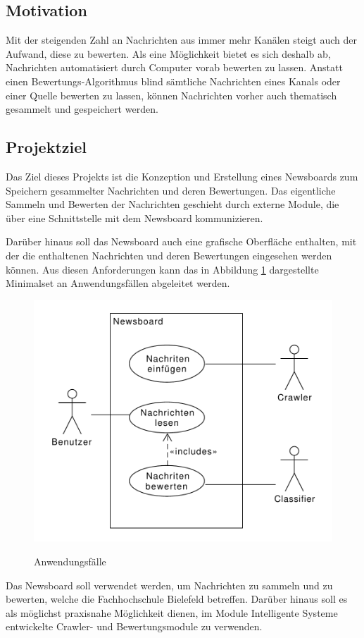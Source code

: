 \subsection{Motivation}
Mit der steigenden Zahl an Nachrichten aus immer mehr Kanälen steigt auch der Aufwand,
diese zu bewerten. Als eine Möglichkeit bietet es sich deshalb ab,
Nachrichten automatisiert durch Computer vorab bewerten zu lassen.
Anstatt einen Bewertungs-Algorithmus blind sämtliche Nachrichten eines Kanals
oder einer Quelle bewerten zu lassen, können Nachrichten vorher auch thematisch gesammelt
und gespeichert werden.

\subsection{Projektziel}
Das Ziel dieses Projekts ist die Konzeption und Erstellung eines Newsboards zum Speichern
gesammelter Nachrichten und deren Bewertungen. Das eigentliche Sammeln
und Bewerten der Nachrichten geschieht durch externe Module,
die über eine Schnittstelle mit dem Newsboard kommunizieren.

Darüber hinaus soll das Newsboard auch eine grafische Oberfläche enthalten,
mit der die enthaltenen Nachrichten und deren Bewertungen eingesehen werden können.
Aus diesen Anforderungen kann das in Abbildung \ref{fig:use-cases} dargestellte
Minimalset an Anwendungsfällen abgeleitet werden.

\begin{figure}[h]
	\centering 
	\includegraphics[scale=0.75]{assets/use-cases.pdf}
	\label{fig:use-cases}
	\caption{Anwendungsfälle}
\end{figure}

Das Newsboard soll verwendet werden, um Nachrichten zu sammeln und zu bewerten,
welche die Fachhochschule Bielefeld betreffen. Darüber hinaus soll es
als möglichst praxisnahe Möglichkeit dienen, im Module Intelligente Systeme entwickelte
Crawler- und Bewertungsmodule zu verwenden.
